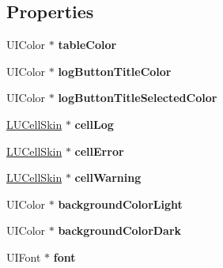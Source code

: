 \subsection*{Properties}
\begin{DoxyCompactItemize}
\item 
\mbox{\label{interface_l_u_theme_ae897e8d4cfd2db6c80885cba938383d1}} 
U\+I\+Color $\ast$ {\bfseries table\+Color}
\item 
\mbox{\label{interface_l_u_theme_a976ede02c4e323b483fea99646e18966}} 
U\+I\+Color $\ast$ {\bfseries log\+Button\+Title\+Color}
\item 
\mbox{\label{interface_l_u_theme_a9444cc67a73262d40d30b4b8115dcf1e}} 
U\+I\+Color $\ast$ {\bfseries log\+Button\+Title\+Selected\+Color}
\item 
\mbox{\label{interface_l_u_theme_a02ecc619445659f89f1b67d3e7cd5296}} 
\mbox{\hyperlink{interface_l_u_cell_skin}{L\+U\+Cell\+Skin}} $\ast$ {\bfseries cell\+Log}
\item 
\mbox{\label{interface_l_u_theme_a7f2ecf72cb4d42c254d3f532bf6455b5}} 
\mbox{\hyperlink{interface_l_u_cell_skin}{L\+U\+Cell\+Skin}} $\ast$ {\bfseries cell\+Error}
\item 
\mbox{\label{interface_l_u_theme_aeb34d326cbd0fbb551249c25a5d21b85}} 
\mbox{\hyperlink{interface_l_u_cell_skin}{L\+U\+Cell\+Skin}} $\ast$ {\bfseries cell\+Warning}
\item 
\mbox{\label{interface_l_u_theme_a4591089dcb4646d7bf43c9585c8353f4}} 
U\+I\+Color $\ast$ {\bfseries background\+Color\+Light}
\item 
\mbox{\label{interface_l_u_theme_a9b69b6f5f3b9227150011ea090ef8e2c}} 
U\+I\+Color $\ast$ {\bfseries background\+Color\+Dark}
\item 
\mbox{\label{interface_l_u_theme_a6505c258b36dbe1e5dfacbbc87d5b0af}} 
U\+I\+Font $\ast$ {\bfseries font}
\item 
\mbox{\label{interface_l_u_theme_a4377a323361904bf0cd26d0ecc8974ef}} 

\end{DoxyCompactItemize}
